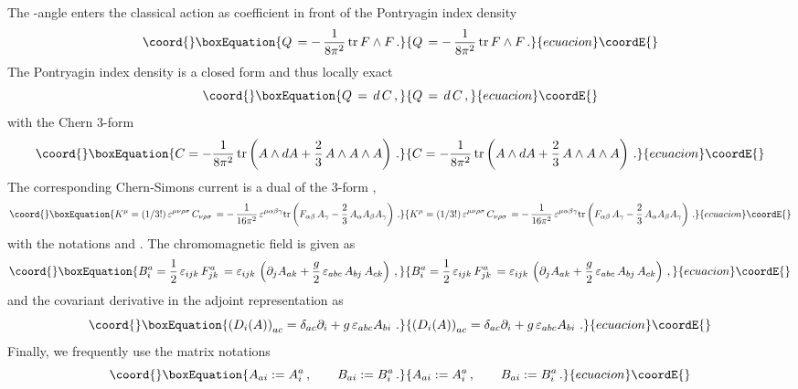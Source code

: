 \documentclass[a4paper,12pt]{article}
\begin{document}
The \myHighlight{$\theta$}\coordHE{}-angle enters the classical action as coefficient in front of
the Pontryagin index density
\begin{equation}\coord{}\boxEquation{
Q\, = -\, \frac{1}{8 \pi^2}\, \mbox{tr} \, F \wedge F\,.
}{
Q\, = -\, \frac{1}{8 \pi^2}\, \mbox{tr} \, F \wedge F\,.
}{ecuacion}\coordE{}\end{equation}
The Pontryagin index density is a closed form \coordHE{} and thus
locally exact
\begin{equation}\coord{}\boxEquation{\label{eq:topcharge}
Q \, = \, d\,C\,,
}{Q \, = \, d\,C\,,
}{ecuacion}\coordE{}\end{equation}
with the Chern 3-form
\begin{equation}\coord{}\boxEquation{
C = - \frac{1}{8 \pi^2}\, {\rm tr}\left( A\wedge dA +
\frac{2}{3}\, A\wedge A\wedge A \right)\,.
}{
C = - \frac{1}{8 \pi^2}\, {\rm tr}\left( A\wedge dA +
\frac{2}{3}\, A\wedge A\wedge A \right)\,.
}{ecuacion}\coordE{}\end{equation}
The corresponding Chern-Simons current \coordHE{}
is a dual of the 3-form \coordHE{},
\begin{equation}\coord{}\boxEquation{
K^\mu =
(1/3!)\, \varepsilon^{\mu\nu\rho\sigma}\, C_{\nu\rho\sigma}\,=
-\,\frac{1}{16 \pi^2}\, \varepsilon^{\mu\alpha\beta\gamma}\mbox{tr}
\left(
F_{\alpha\beta}\, A_\gamma - \frac{2}{3}\, A_\alpha A_\beta A_\gamma
\right)\,.
}{
K^\mu =
(1/3!)\, \varepsilon^{\mu\nu\rho\sigma}\, C_{\nu\rho\sigma}\,=
-\,\frac{1}{16 \pi^2}\, \varepsilon^{\mu\alpha\beta\gamma}\mbox{tr}
\left(
F_{\alpha\beta}\, A_\gamma - \frac{2}{3}\, A_\alpha A_\beta A_\gamma
\right)\,.
}{ecuacion}\coordE{}\end{equation}
with the notations \coordHE{} and
\coordHE{}.
The chromomagnetic field is given as
\begin{equation}\coord{}\boxEquation{
B^a_{i} = \frac{1}{2} \, \varepsilon_{ijk}\, F^a_{jk}\, =
\varepsilon_{ijk}\, \left(\partial_j A_{ak} + \frac{g}{2}\,
\varepsilon_{abc}\, A_{bj}\, A_{ck}\right)\,,
}{
B^a_{i} = \frac{1}{2} \, \varepsilon_{ijk}\, F^a_{jk}\, =
\varepsilon_{ijk}\, \left(\partial_j A_{ak} + \frac{g}{2}\,
\varepsilon_{abc}\, A_{bj}\, A_{ck}\right)\,,
}{ecuacion}\coordE{}\end{equation}
and the covariant derivative in the adjoint representation as
\begin{equation}\coord{}\boxEquation{
\left( D_i (A) \right)_{ac}  =
\delta_{ac} \partial_i +  g\, \varepsilon_{abc} A_{bi}~.
}{
\left( D_i (A) \right)_{ac}  =
\delta_{ac} \partial_i +  g\, \varepsilon_{abc} A_{bi}~.
}{ecuacion}\coordE{}\end{equation}
Finally, we frequently use the matrix notations
\begin{equation}\coord{}\boxEquation{
A_{ai} := A^a_{i}\,,\qquad
B_{ai} := B^a_{i}\,.
}{
A_{ai} := A^a_{i}\,,\qquad
B_{ai} := B^a_{i}\,.
}{ecuacion}\coordE{}\end{equation}
\end{document}
